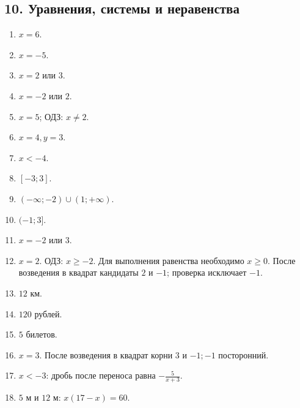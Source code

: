 \documentclass[12pt,a4paper]{article}
\theoremstyle{definition}
\theoremstyle{plain}
\theoremstyle{remark}
\newcommand{\starmark}{\ensuremath{{}^{\ast}}}
\begin{document}
\subsection*{10. Уравнения, системы и неравенства}
\begin{enumerate}[label=10.\arabic*.,leftmargin=2.8em,itemsep=5pt]
\item \(x = 6\).
\item \(x = - 5\).
\item \(x = 2\) или \(3\).
\item \(x = - 2\) или \(2\).
\item \(x = 5\); ОДЗ: \(x \ne  2\).
\item \(x = 4,\allowbreak y = 3\).
\item \(x < - 4\).
\item \([- 3;\allowbreak 3]\).
\item \((- \infty ;\allowbreak - 2) \cup  (1;\allowbreak + \infty )\).
\item \((- 1;\allowbreak 3]\).
\item \(x = - 2\) или \(3\).
\item \(x=2\). ОДЗ: \(x\ge-2\). Для выполнения равенства необходимо \(x\ge0\). После возведения в квадрат кандидаты \(2\) и \(-1\); проверка исключает \(-1\).
\item \(12\) км.
\item \(120\) рублей.
\item \(5\) билетов.
\item[\textbf{10.16.}\starmark] \(x = 3\). После возведения в квадрат корни \(3\) и \(- 1;\allowbreak - 1\) посторонний.
\item[\textbf{10.17.}\starmark] \(x < - 3\): дробь после переноса равна \(- \frac{5}{x + 3}\).
\item[\textbf{10.18.}\starmark] \(5\) м и \(12\) м: \(x (17 - x) = 60\).
\end{enumerate}
\end{document}
